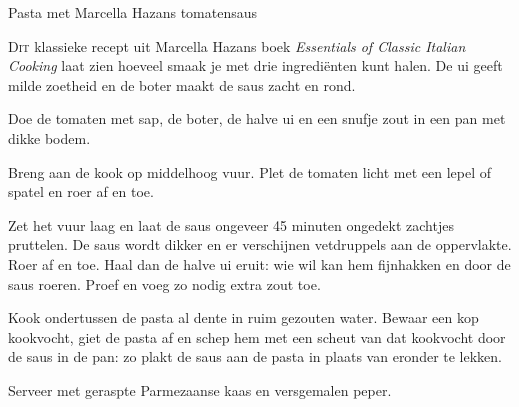 \begin{recipe}{Pasta met Marcella Hazans tomatensaus}



\lettrine{D}{it} klassieke recept uit Marcella Hazans boek \textit{Essentials
of Classic Italian Cooking} laat zien hoeveel smaak je met drie ingrediënten
kunt halen. De ui geeft milde zoetheid en de boter maakt de saus zacht en rond.

\begin{ingredients}
\end{ingredients}

\begin{steps}
  \item Doe de tomaten met sap, de boter, de halve ui en een snufje zout in een
        pan met dikke bodem.
  \item Breng aan de kook op middelhoog vuur. Plet de tomaten licht met een
        lepel of spatel en roer af en toe.
  \item Zet het vuur laag en laat de saus ongeveer 45 minuten ongedekt zachtjes
        pruttelen. De saus wordt dikker en er verschijnen vetdruppels aan de
        oppervlakte. Roer af en toe. Haal dan de halve ui eruit: wie wil kan
        hem fijnhakken en door de saus roeren. Proef en voeg zo nodig extra
        zout toe.
  \item Kook ondertussen de pasta al dente in ruim gezouten water. Bewaar een
        kop kookvocht, giet de pasta af en schep hem met een scheut van dat
        kookvocht door de saus in de pan: zo plakt de saus aan de pasta in
        plaats van eronder te lekken.
  \item Serveer met geraspte Parmezaanse kaas en versgemalen peper.
\end{steps}
\end{recipe}
